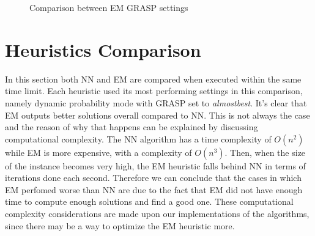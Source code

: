 \begin{figure}[htbp]
	\centering
	\caption{Comparison between EM GRASP settings}
    \label{fig:emCmp}
\end{figure}

\section{Heuristics Comparison}

In this section both NN and EM are compared when executed within the same time limit.
Each heuristic used its most performing settings in this comparison, namely dynamic probability mode with GRASP set to \textit{almostbest}.
It's clear that EM outputs better solutions overall compared to NN.
This is not always the case and the reason of why that happens can be explained by discussing computational complexity.
The NN algorithm has a time complexity of $O(n^2)$ while EM is more expensive, with a complexity of $O(n^3)$.
Then, when the size of the instance becomes very high, the EM heuristic falls behind NN in terms of iterations done each second.
Therefore we can conclude that the cases in which EM perfomed worse than NN are due to the fact that EM did not have enough time to compute enough solutions and find a good one.
These computational complexity considerations are made upon our implementations of the algorithms, since there may be a way to optimize the EM heuristic more.

